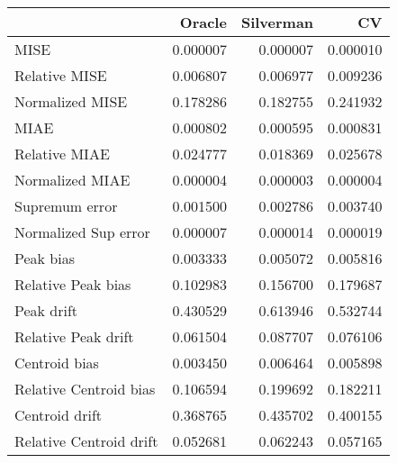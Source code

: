 \begin{tabular}{lrrr}
  \toprule
 & Oracle & Silverman & CV \\ 
  \midrule
MISE & 0.000007 & 0.000007 & 0.000010 \\ 
  Relative MISE & 0.006807 & 0.006977 & 0.009236 \\ 
  Normalized MISE & 0.178286 & 0.182755 & 0.241932 \\ 
  MIAE & 0.000802 & 0.000595 & 0.000831 \\ 
  Relative MIAE & 0.024777 & 0.018369 & 0.025678 \\ 
  Normalized MIAE & 0.000004 & 0.000003 & 0.000004 \\ 
  Supremum error & 0.001500 & 0.002786 & 0.003740 \\ 
  Normalized Sup error & 0.000007 & 0.000014 & 0.000019 \\ 
  Peak bias & 0.003333 & 0.005072 & 0.005816 \\ 
  Relative Peak bias & 0.102983 & 0.156700 & 0.179687 \\ 
  Peak drift & 0.430529 & 0.613946 & 0.532744 \\ 
  Relative Peak drift & 0.061504 & 0.087707 & 0.076106 \\ 
  Centroid bias & 0.003450 & 0.006464 & 0.005898 \\ 
  Relative Centroid bias & 0.106594 & 0.199692 & 0.182211 \\ 
  Centroid drift & 0.368765 & 0.435702 & 0.400155 \\ 
  Relative Centroid drift & 0.052681 & 0.062243 & 0.057165 \\ 
   \bottomrule
\end{tabular}
